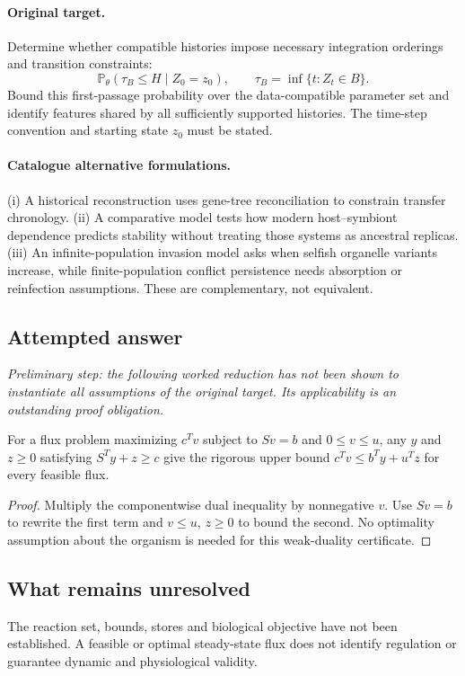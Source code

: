 \documentclass[11pt]{article}
\begin{document}
\paragraph{Original target.}
Determine whether compatible histories impose necessary integration orderings and transition constraints:
    \[\mathbb{P}_\theta(\tau_B\leq H\mid Z_0=z_0),\qquad
    \tau_B=\inf\{t:Z_t\in B\}.\]
    Bound this first-passage probability over the data-compatible parameter set and identify features shared by all sufficiently supported histories. The time-step convention and starting state $z_0$ must be stated.
\paragraph{Catalogue alternative formulations.}
(i) A historical reconstruction uses gene-tree reconciliation to constrain transfer chronology. (ii) A comparative model tests how modern host--symbiont dependence predicts stability without treating those systems as ancestral replicas. (iii) An infinite-population invasion model asks when selfish organelle variants increase, while finite-population conflict persistence needs absorption or reinfection assumptions. These are complementary, not equivalent.
\subsection{Attempted answer}
\noindent\emph{Preliminary step: the following worked reduction has not been shown to instantiate all assumptions of the original target. Its applicability is an outstanding proof obligation.}

\begin{proposition}
For a flux problem maximizing $c^Tv$ subject to $Sv=b$ and $0\leq v\leq u$, any $y$ and $z\geq0$ satisfying $S^Ty+z\geq c$ give the rigorous upper bound $c^Tv\leq b^Ty+u^Tz$ for every feasible flux.
\end{proposition}
\begin{proof}
Multiply the componentwise dual inequality by nonnegative $v$. Use $Sv=b$ to rewrite the first term and $v\leq u$, $z\geq0$ to bound the second. No optimality assumption about the organism is needed for this weak-duality certificate.
\end{proof}
\subsection{What remains unresolved}
The reaction set, bounds, stores and biological objective have not been established. A feasible or optimal steady-state flux does not identify regulation or guarantee dynamic and physiological validity.
\end{document}
